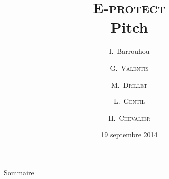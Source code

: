 \documentclass[french]{beamer}
\title{\textsc{E-protect}\\ Pitch}
\author{I.~Barrouhou\inst{1} \and G.~\textsc{Valentis}\inst{1} \and M.~\textsc{Drillet}\inst{2} \and L.~\textsc{Gentil}\inst{2} \and H.~\textsc{Chevalier}\inst{3}}
\institute[ECE Paris] %
{
	ECE Paris École d'Ingénieurs\\
	\inst{1}
	Systèmes Embarqués\\
	\inst{2}
	Systèmes d'Informations\\
	\inst{3}
	Energie et Environnement\\}
\date{19 septembre 2014}
\begin{document}
\begin{frame}
  \titlepage
\end{frame}

\begin{frame}{Sommaire}{~}
  \tableofcontents
\end{frame}

% 
\end{document}
